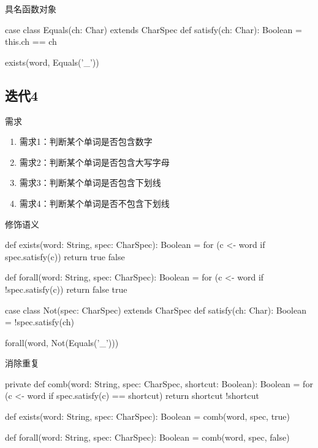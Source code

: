 \begin{frame}[fragile]{具名函数对象}
  \begin{scala}
case class Equals(ch: Char) extends CharSpec {
  def satisfy(ch: Char): Boolean = this.ch == ch
}

exists(word, Equals('_'))
  \end{scala}
\end{frame}

\subsection{迭代4}

\begin{frame}{需求}
  \begin{block}{}
    \begin{enumerate}
    \item \alert{需求1}：判断某个单词是否包含数字
    \item \alert{需求2}：判断某个单词是否包含大写字母
    \item \alert{需求3}：判断某个单词是否包含下划线 
    \item \alert{需求4}：判断某个单词是否不包含下划线     
    \end{enumerate}
  \end{block}
\end{frame}

\begin{frame}[fragile]{修饰语义}
  \begin{scala}
def exists(word: String, spec: CharSpec): Boolean = {
  for (c <- word if spec.satisfy(c))  
    return true
  false
}

def forall(word: String, spec: CharSpec): Boolean = {
  for (c <- word if !spec.satisfy(c))  
    return false
  true
}

case class Not(spec: CharSpec) extends CharSpec {
  def satisfy(ch: Char): Boolean = !spec.satisfy(ch)
}

forall(word, Not(Equals('_')))
  \end{scala}
\end{frame}

\begin{frame}[fragile]{消除重复}
  \begin{scala}
private def comb(word: String, spec: CharSpec, shortcut: Boolean): Boolean = {
  for (c <- word if spec.satisfy(c) == shortcut) 
    return shortcut
  !shortcut
}

def exists(word: String, spec: CharSpec): Boolean = 
  comb(word, spec, true)

def forall(word: String, spec: CharSpec): Boolean = 
  comb(word, spec, false)
  \end{scala}
\end{frame}

